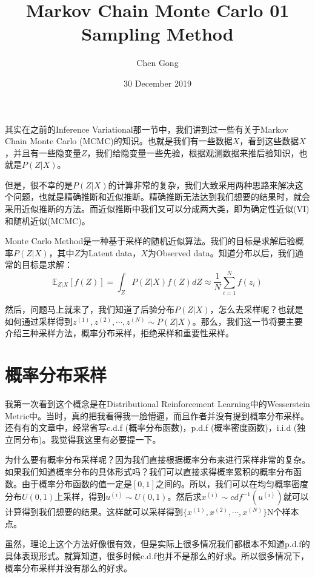 \documentclass[a4paper]{article}
\title{Markov Chain Monte Carlo 01 Sampling Method}
\author{Chen Gong}
\date{30 December 2019}
\begin{document}
\maketitle
其实在之前的Inference Variational那一节中，我们讲到过一些有关于Markov Chain Monte Carlo (MCMC)的知识。也就是我们有一些数据$X$，看到这些数据$X$，并且有一些隐变量$Z$，我们给隐变量一些先验，根据观测数据来推后验知识，也就是$P(Z|X)$。

但是，很不幸的是$P(Z|X)$的计算非常的复杂，我们大致采用两种思路来解决这个问题，也就是精确推断和近似推断。精确推断无法达到我们想要的结果时，就会采用近似推断的方法。而近似推断中我们又可以分成两大类，即为确定性近似(VI)和随机近似(MCMC)。

Monte Carlo Method是一种基于采样的随机近似算法。我们的目标是求解后验概率$P(Z|X)$，其中$Z$为Latent data，$X$为Observed data。知道分布以后，我们通常的目标是求解：
\begin{equation}
    \mathbb{E}_{Z|X}[f(Z)] = \int_Z P(Z|X)f(Z)dZ \approx \frac{1}{N}\sum_{i=1}^N f(z_i)
\end{equation}

然后，问题马上就来了，我们知道了后验分布$P(Z|X)$，怎么去采样呢？也就是如何通过采样得到$z^{(1)},z^{(2)},\cdots,z^{(N)} \sim P(Z|X)$。那么，我们这一节将要主要介绍三种采样方法，概率分布采样，拒绝采样和重要性采样。

\section{概率分布采样}
我第一次看到这个概念是在Distributional Reinforcement Learning中的Wesserstein Metric中。当时，真的把我看得我一脸懵逼，而且作者并没有提到概率分布采样。还有有的文章中，经常省写c.d.f (概率分布函数)，p.d.f (概率密度函数)，i.i.d (独立同分布)。我觉得我这里有必要提一下。

为什么要有概率分布采样呢？因为我们直接根据概率分布来进行采样非常的复杂。如果我们知道概率分布的具体形式吗？我们可以直接求得概率累积的概率分布函数。由于概率分布函数的值一定是$[0,1]$之间的。所以，我们可以在均匀概率密度分布$U(0,1)$上采样，得到$u^{(i)}\sim U(0,1)$。然后求$x^{(i)}\sim cdf^{-1}(u^{(i)})$就可以计算得到我们想要的结果。这样就可以采样得到$\{ x^{(1)},x^{(2)},\cdots,x^{(N)} \}$N个样本点。

虽然，理论上这个方法好像很有效，但是实际上很多情况我们都根本不知道p.d.f的具体表现形式。就算知道，很多时候c.d.f也并不是那么的好求。所以很多情况下，概率分布采样并没有那么的好求。
\end{document}
